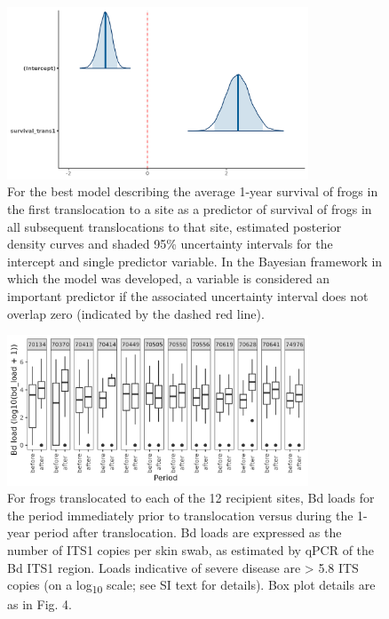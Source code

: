 \documentclass[9pt,twoside,lineno]{pnas-new}
\begin{document}
\begin{figure}

{\centering \includegraphics[width=0.8\textwidth]{figures/mcmc_areas_m2b.png}

}

\caption{\label{fig-transsurvival-postdens}For the best model describing
the average 1-year survival of frogs in the first translocation to a
site as a predictor of survival of frogs in all subsequent
translocations to that site, estimated posterior density curves and
shaded 95\% uncertainty intervals for the intercept and single predictor
variable. In the Bayesian framework in which the model was developed, a
variable is considered an important predictor if the associated
uncertainty interval does not overlap zero (indicated by the dashed red
line).}

\end{figure}\clearpage

\begin{figure}

{\centering \includegraphics[width=0.8\textwidth]{figures/bdload_beforeafter.png}

}

\caption{\label{fig-bdload-beforeafter}For frogs translocated to each of
the 12 recipient sites, Bd loads for the period immediately prior to
translocation versus during the 1-year period after translocation. Bd
loads are expressed as the number of ITS1 copies per skin swab, as
estimated by qPCR of the Bd ITS1 region. Loads indicative of severe
disease are \textgreater{} 5.8 ITS copies (on a log\textsubscript{10}
scale; see SI text for details). Box plot details are as in
Fig. 4.}

\end{figure}\clearpage
\end{document}
